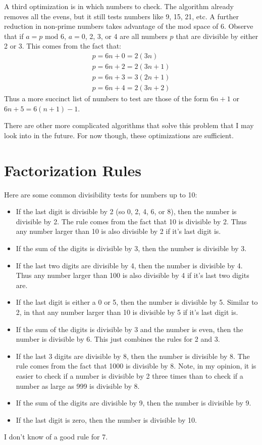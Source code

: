 \documentclass{article}
\begin{document}
A third optimization is in which numbers to check. The algorithm already removes all the evens, but it still tests numbers like 9, 15, 21, etc. A further reduction in non-prime numbers takes advantage of the mod space of 6. Observe that if $a = p \text{ mod } 6$, $a = 0$, 2, 3, or 4 are all numbers $p$ that are divisible by either 2 or 3. This comes from the fact that:
\begin{align*}
	p = 6n + 0 = 2(3n)\\
	p = 6n + 2 = 2(3n + 1)\\
	p = 6n + 3 = 3(2n + 1)\\
	p = 6n + 4 = 2(3n + 2)
\end{align*}
Thus a more succinct list of numbers to test are those of the form $6n + 1$ or $6n + 5 = 6(n + 1) - 1$.

There are other more complicated algorithms that solve this problem that I may look into in the future. For now though, these optimizations are sufficient.
\section*{Factorization Rules}
Here are some common divisibility tests for numbers up to 10:
\begin{itemize}
	\item If the last digit is divisible by 2 (so 0, 2, 4, 6, or 8), then the number is divisible by 2. The rule comes from the fact that 10 is divisible by 2. Thus any number larger than 10 is also divisible by 2 if it's last digit is.
	\item If the sum of the digits is divisible by 3, then the number is divisible by 3.
	\item If the last two digits are divisible by 4, then the number is divisible by 4. Thus any number larger than 100 is also divisible by 4 if it's last two digits are.
	\item If the last digit is either a 0 or 5, then the number is divisible by 5. Similar to 2, in that any number larger than 10 is divisible by 5 if it's last digit is.
	\item If the sum of the digits is divisible by 3 and the number is even, then the number is divisible by 6. This just combines the rules for 2 and 3.
	\item If the last 3 digits are divisible by 8, then the number is divisible by 8. The rule comes from the fact that 1000 is divisible by 8. Note, in my opinion, it is easier to check if a number is divisible by 2 three times than to check if a number as large as 999 is divisible by 8.
	\item If the sum of the digits are divisible by 9, then the number is divisible by 9.
	\item If the last digit is zero, then the number is divisible by 10.
\end{itemize}
I don't know of a good rule for 7.
\end{document}
